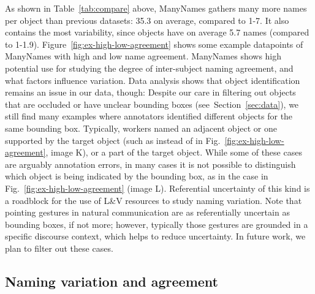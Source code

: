 As shown in Table~\ref{tab:compare} above, ManyNames gathers many more names per object than previous datasets: 35.3 on average, compared to 1-7.
It also contains the most variability, since objects have on average 5.7 names (compared to 1-1.9).
Figure~\ref{fig:ex-high-low-agreement} shows some example datapoints of ManyNames with high and low name agreement.
ManyNames 
shows high potential use for studying the degree of inter-subject naming agreement, and what factors influence variation.
Data analysis shows that object identification remains an issue in our data, though: Despite our care in filtering out objects that are occluded or have unclear bounding boxes (see\ Section~\ref{sec:data}), we still find many examples where annotators identified different objects for the same bounding box. 
Typically, workers named an adjacent object or one supported by the target object (such as  instead of  in Fig.~\ref{fig:ex-high-low-agreement}, image K), or a part of the target object.
While some of these cases are arguably annotation errors, in many cases it is not possible to distinguish which object is being indicated by the bounding box, as in the  case in Fig.~\ref{fig:ex-high-low-agreement} (image L).
Referential uncertainty of this kind is a roadblock for the use of L\&V resources to study naming variation.
Note that pointing gestures in natural communication are as referentially uncertain as bounding boxes, if not more; however, typically those gestures are grounded in a specific discourse context, which helps to reduce uncertainty.
In future work, we plan to filter out these cases.

\subsection{Naming variation and agreement}
\label{subsec:counts}

